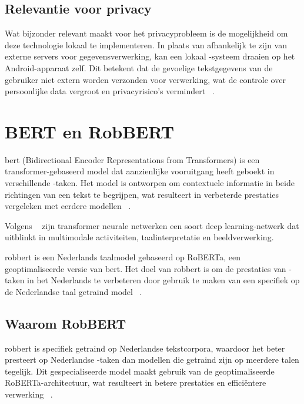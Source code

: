 \subsection{Relevantie voor privacy}

Wat  bijzonder relevant maakt voor het privacyprobleem is de mogelijkheid om deze technologie lokaal te implementeren. In plaats van afhankelijk te zijn van externe servers voor gegevensverwerking, kan een lokaal -systeem draaien op het Android-apparaat zelf. Dit betekent dat de gevoelige tekstgegevens van de gebruiker niet extern worden verzonden voor verwerking, wat de controle over persoonlijke data vergroot en pri\-va\-cy\-risico's ver\-min\-dert ~\autocite{Cistac2019}.

\section{BERT en RobBERT}

\Gls{bert} (Bidirectional Encoder Representations from Transformers) is een \gls{transformer}-gebaseerd model dat aanzienlijke vooruitgang heeft geboekt in verschillende -taken. Het model is ontworpen om contextuele informatie in beide richtingen van een tekst te begrijpen, wat resulteert in verbeterde prestaties vergeleken met eerdere modellen ~\autocite{Delobelle2020}.

Volgens ~\textcite{Singh2023} zijn \gls{transformer} neurale netwerken een soort deep learn\-ing-netwerk dat uitblinkt in multimodale activiteiten, taalinterpretatie en beeldverwerking.

\gls{robbert} is een Nederlands taalmodel gebaseerd op RoBERTa, een geoptimaliseerde versie van \gls{bert}. Het doel van \gls{robbert} is om de prestaties van -taken in het Nederlands te verbeteren door gebruik te maken van een specifiek op de Nederlandse taal getraind model ~\autocite{Delobelle2021}.

\subsection{Waarom RobBERT}

\gls{robbert} is specifiek getraind op Nederlandse tekstcorpora, waardoor het beter presteert op Nederlandse -taken dan modellen die getraind zijn op meerdere talen tegelijk. Dit gespecialiseerde model maakt gebruik van de geoptimaliseerde RoBERTa-architectuur, wat resulteert in betere prestaties en efficiëntere verwerking ~\autocite{Delobelle2021}.

